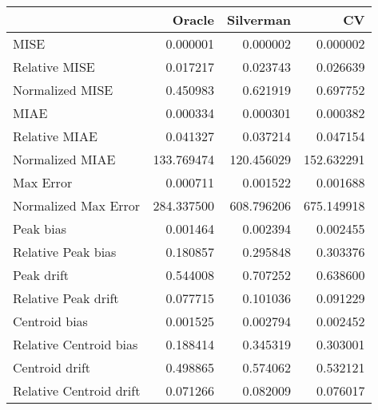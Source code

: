 \begin{tabular}{lrrr}
  \hline
 & Oracle & Silverman & CV \\ 
  \hline
MISE & 0.000001 & 0.000002 & 0.000002 \\ 
  Relative MISE & 0.017217 & 0.023743 & 0.026639 \\ 
  Normalized MISE & 0.450983 & 0.621919 & 0.697752 \\ 
  MIAE & 0.000334 & 0.000301 & 0.000382 \\ 
  Relative MIAE & 0.041327 & 0.037214 & 0.047154 \\ 
  Normalized MIAE & 133.769474 & 120.456029 & 152.632291 \\ 
  Max Error & 0.000711 & 0.001522 & 0.001688 \\ 
  Normalized Max Error & 284.337500 & 608.796206 & 675.149918 \\ 
  Peak bias & 0.001464 & 0.002394 & 0.002455 \\ 
  Relative Peak bias & 0.180857 & 0.295848 & 0.303376 \\ 
  Peak drift & 0.544008 & 0.707252 & 0.638600 \\ 
  Relative Peak drift & 0.077715 & 0.101036 & 0.091229 \\ 
  Centroid bias & 0.001525 & 0.002794 & 0.002452 \\ 
  Relative Centroid bias & 0.188414 & 0.345319 & 0.303001 \\ 
  Centroid drift & 0.498865 & 0.574062 & 0.532121 \\ 
  Relative Centroid drift & 0.071266 & 0.082009 & 0.076017 \\ 
   \hline
\end{tabular}
